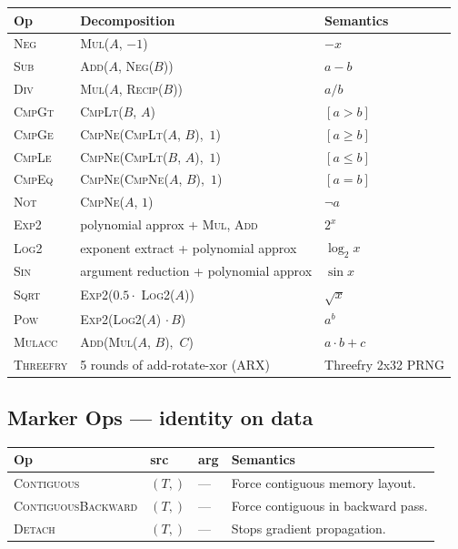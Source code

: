 \documentclass[10pt,letterpaper]{article}
\newcommand{\op}[1]{\textsc{#1}}
\begin{document}
\smallskip
\begin{tabular}{@{}l l l@{}}
\toprule
\textbf{Op} & \textbf{Decomposition} & \textbf{Semantics} \\
\midrule
\op{Neg} & \op{Mul}($A$, $-1$) & $-x$ \\
\op{Sub} & \op{Add}($A$, \op{Neg}($B$)) & $a - b$ \\
\op{Div} & \op{Mul}($A$, \op{Recip}($B$)) & $a / b$ \\
\op{CmpGt} & \op{CmpLt}($B$, $A$) & $[a > b]$ \\
\op{CmpGe} & \op{CmpNe}(\op{CmpLt}($A$, $B$),\, $1$) & $[a \ge b]$ \\
\op{CmpLe} & \op{CmpNe}(\op{CmpLt}($B$, $A$),\, $1$) & $[a \le b]$ \\
\op{CmpEq} & \op{CmpNe}(\op{CmpNe}($A$, $B$),\, $1$) & $[a = b]$ \\
\op{Not} & \op{CmpNe}($A$, $1$) & $\lnot a$ \\[4pt]
\op{Exp2} & polynomial approx + \op{Mul}, \op{Add} & $2^x$ \\
\op{Log2} & exponent extract + polynomial approx & $\log_2 x$ \\
\op{Sin} & argument reduction + polynomial approx & $\sin x$ \\
\op{Sqrt} & \op{Exp2}($0.5 \cdot$ \op{Log2}($A$)) & $\sqrt{x}$ \\
\op{Pow} & \op{Exp2}(\op{Log2}($A$) $\cdot\, B$) & $a^b$ \\
\op{Mulacc} & \op{Add}(\op{Mul}($A$, $B$),\, $C$) & $a \cdot b + c$ \\
\op{Threefry} & 5 rounds of add-rotate-xor (ARX) & Threefry 2x32 PRNG \\
\bottomrule
\end{tabular}

\subsection*{{\color{markerorange}Marker Ops} \normalfont\small--- identity on data}

\begin{tabular}{@{}l l l l@{}}
\toprule
\textbf{Op} & \textbf{src} & \textbf{arg} & \textbf{Semantics} \\
\midrule
\op{Contiguous} & $(T,)$ & --- & Force contiguous memory layout. \\
\op{ContiguousBackward} & $(T,)$ & --- & Force contiguous in backward pass. \\
\op{Detach} & $(T,)$ & --- & Stops gradient propagation. \\
\bottomrule
\end{tabular}
\end{document}
